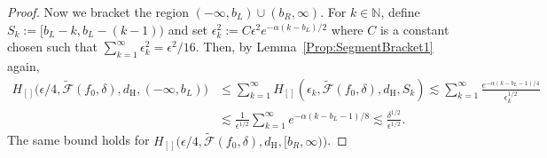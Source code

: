 \documentclass[a4paper,12pt]{article}
\begin{document}
\begin{proof}
Now we bracket the region $(-\infty, b_L) \cup (b_R, \infty)$.  For $k \in \mathbb{N}$, define $S_k := [b_L - k, b_L - (k-1))$ and set $\epsilon^2_k := C \epsilon^2 e^{-\alpha(k - b_L)/2}$ where $C$ is a constant chosen such that $\sum_{k=1}^\infty \epsilon^2_k = \epsilon^2/16$.  Then, 
by Lemma~\ref{Prop:SegmentBracket1} again, 
  \begin{align}
\label{Eq:bL}
H_{[]}\bigl(\epsilon/4, \tilde{\mathcal{F}}(f_0, \delta), d_{\mathrm{H}}, (-\infty, b_L)\bigr) &\leq \sum_{k=1}^\infty H_{[]}(\epsilon_k, \tilde{\mathcal{F}}(f_0, \delta), d_{\mathrm{H}}, S_k) 
    \lesssim \sum_{k=1}^\infty \frac{e^{-\alpha(k - b_L-1)/4}}{\epsilon_k^{1/2}} \nonumber \\
    &\lesssim \frac{1}{\epsilon^{1/2}}\sum_{k=1}^\infty e^{-\alpha(k - b_L-1)/8} \lesssim \frac{\delta^{1/2}}{\epsilon^{1/2}}.
  \end{align}
The same bound holds for $H_{[]}\bigl( \epsilon/4, \tilde{\mathcal{F}}(f_0, \delta), d_{\mathrm{H}}, [b_R, \infty)\bigr)$.
    

\end{proof}
\end{document}
